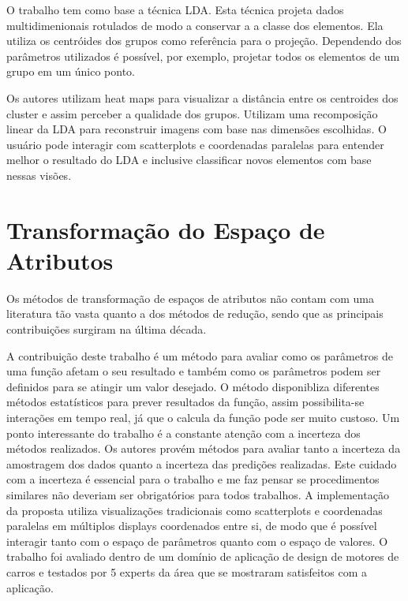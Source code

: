 O trabalho tem como base a técnica LDA. Esta técnica projeta dados multidimenionais rotulados de modo a conservar a a classe dos elementos. Ela utiliza os centróides dos grupos como referência para o projeção. Dependendo dos parâmetros utilizados é possível, por exemplo, projetar todos os elementos de um grupo em um único ponto.

Os autores utilizam heat maps para visualizar a distância entre os centroides dos cluster e assim perceber a qualidade dos grupos. Utilizam uma recomposição linear da LDA para reconstruir imagens com base nas dimensões escolhidas. O usuário pode interagir com scatterplots e coordenadas paralelas para entender melhor o resultado do LDA e inclusive classificar novos elementos com base nessas visões.

\section{Transformação do Espaço de Atributos}

Os métodos de transformação de espaços de atributos não contam com uma literatura tão vasta quanto a dos métodos de redução, sendo que as principais contribuições surgiram na última década.



A contribuição deste trabalho é um método para avaliar como os parâmetros de uma função afetam o seu resultado e também como os parâmetros podem ser definidos para se atingir um valor desejado. O método disponibliza diferentes métodos estatísticos para prever resultados da função, assim possibilita-se interações em tempo real, já que o calcula da função pode ser muito custoso. Um ponto interessante do trabalho é a constante atenção com a incerteza dos métodos realizados. Os autores provém métodos para avaliar tanto a incerteza da amostragem dos dados quanto a incerteza das predições realizadas. Este cuidado com a incerteza é essencial para o trabalho e me faz pensar se procedimentos similares não deveriam ser obrigatórios para todos trabalhos. A implementação da proposta utiliza visualizações tradicionais como scatterplots e coordenadas paralelas em múltiplos displays coordenados entre si, de modo que é possível interagir tanto com o espaço de parâmetros quanto com o espaço de valores. O trabalho foi avaliado dentro  de um domínio de aplicação de design de motores de carros e testados por 5 experts da área que se mostraram satisfeitos com a aplicação.

